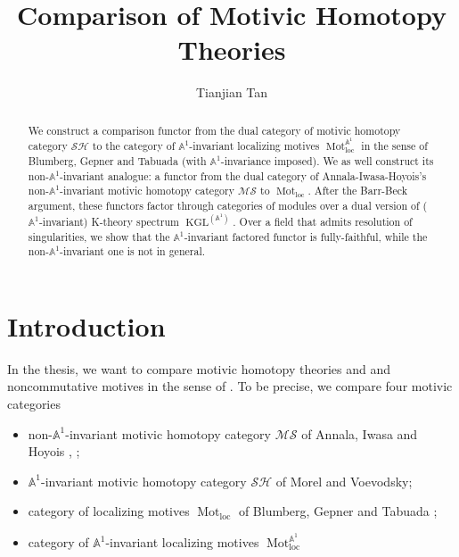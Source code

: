 \documentclass{article}
\title{Comparison of Motivic Homotopy Theories}
\author{Tianjian Tan}
\date{}
\theoremstyle{definition}
\newcommand{\on}{\operatorname}
\begin{document}
\maketitle
\begin{abstract}
 We construct a comparison functor from the dual category of motivic homotopy category $\mathcal{SH}$ to the category of $\mathbb{A}^1$-invariant localizing motives $\on{Mot}_{\on{loc}}^{\mathbb{A}^1}$ in the sense of Blumberg, Gepner and Tabuada (with $\mathbb{A}^1$-invariance imposed). We as well construct its non-$\mathbb{A}^1$-invariant analogue: a functor from the dual category of Annala-Iwasa-Hoyois's non-$\mathbb{A}^1$-invariant motivic homotopy category $\mathcal{MS}$ to $\on{Mot}_{\on{loc}}$. After the Barr-Beck argument, these functors factor through categories of modules over a dual version of ($\mathbb{A}^1$-invariant) K-theory spectrum $\on{KGL}^{(\mathbb{A}^1)}$. Over a field that admits resolution of singularities, we show that the $\mathbb{A}^1$-invariant factored functor is fully-faithful, while the non-$\mathbb{A}^1$-invariant one is not in general.
\end{abstract}
\tableofcontents


\section{Introduction}
In the thesis, we want to compare motivic homotopy theories and and noncommutative motives in the sense of \cite{BGT}. To be precise, we compare four motivic categories\begin{itemize}
\item non-$\mathbb{A}^1$-invariant motivic homotopy category $\mathcal{MS}$ of Annala, Iwasa and Hoyois \cite{AI}, \cite{AHI};
\item $\mathbb{A}^1$-invariant motivic homotopy category $\mathcal{SH}$ of Morel and Voevodsky;
\item category of localizing motives $\on{Mot}_{\on{loc}}$ of Blumberg, Gepner and Tabuada \cite{BGT};
\item category of $\mathbb{A}^1$-invariant localizing motives $\on{Mot}_{\on{loc}}^{\mathbb{A}^1}$
\end{itemize}
\end{document}
